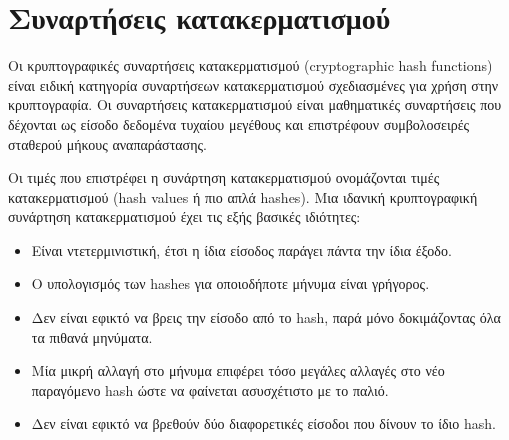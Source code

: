 \section{Συναρτήσεις κατακερματισμού}

Οι κρυπτογραφικές συναρτήσεις κατακερματισμού (cryptographic hash functions) είναι ειδική κατηγορία συναρτήσεων κατακερματισμού σχεδιασμένες για χρήση στην κρυπτογραφία. Οι συναρτήσεις κατακερματισμού είναι μαθηματικές συναρτήσεις που δέχονται ως είσοδο δεδομένα τυχαίου μεγέθους και επιστρέφουν συμβολοσειρές σταθερού μήκους αναπαράστασης.


Οι τιμές που επιστρέφει η συνάρτηση κατακερματισμού ονομάζονται τιμές κατακερματισμού (hash values ή πιο απλά hashes). Μια ιδανική κρυπτογραφική συνάρτηση κατακερματισμού έχει τις εξής βασικές ιδιότητες:

\begin{itemize}
    \item Είναι ντετερμινιστική, έτσι η ίδια είσοδος παράγει πάντα την ίδια έξοδο.
    \item Ο υπολογισμός των hashes για οποιοδήποτε μήνυμα είναι γρήγορος.
    \item Δεν είναι εφικτό να βρεις την είσοδο από το hash, παρά μόνο δοκιμάζοντας όλα τα πιθανά μηνύματα.
    \item Μία μικρή αλλαγή στο μήνυμα επιφέρει τόσο μεγάλες αλλαγές στο νέο παραγόμενο hash ώστε να φαίνεται ασυσχέτιστο με το παλιό.
    \item Δεν είναι εφικτό να βρεθούν δύο διαφορετικές είσοδοι που δίνουν το ίδιο hash.
\end{itemize}

